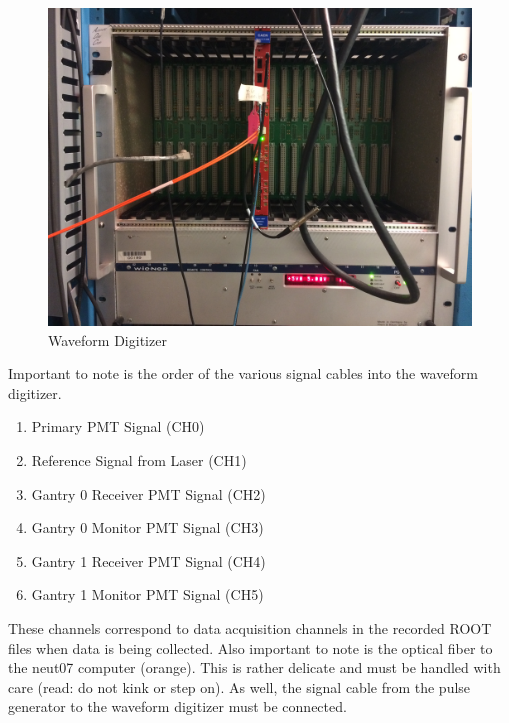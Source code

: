\documentclass[twoside,letterpaper]{refart}
\begin{document}
\begin{figure}[!htpb] 
	\centering	
	\includegraphics[scale=0.06]{images/digiCrate}
	\caption{Waveform Digitizer}
	\label{wvDigi}
\end{figure}

\FloatBarrier

Important to note is the order of the various signal cables into the waveform digitizer.

\begin{enumerate}
	
	\item Primary PMT Signal (CH0)
	\item Reference Signal from Laser (CH1)
	\item Gantry 0 Receiver PMT Signal (CH2)
	\item Gantry 0 Monitor PMT Signal (CH3)
	\item Gantry 1 Receiver PMT Signal (CH4)
	\item Gantry 1 Monitor PMT Signal (CH5)
	
\end{enumerate}

These channels correspond to data acquisition channels in the recorded ROOT files when data is being collected. Also important to note is the optical fiber to the neut07 computer (orange).  This is rather delicate and must be handled with care (read: do not kink or step on). As well, the signal cable from the pulse generator to the waveform digitizer must be connected.

\FloatBarrier
\end{document}
